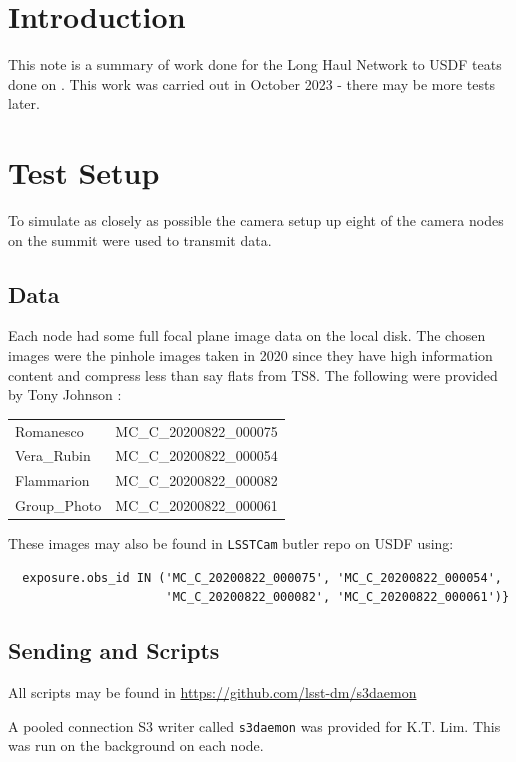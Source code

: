 
\section{Introduction}

This note is a summary of work done for the Long Haul Network to USDF teats done on .
This work was carried out in October 2023 - there may be more tests later.

\section {Test Setup}

To simulate as closely as possible the camera setup up eight of the camera nodes on the summit
were used to transmit data.

\subsection{Data}
Each node had some full focal plane image data on the local disk.
The chosen images were the pinhole images taken in 2020 since they have high information content and compress less than say flats from TS8.
The following  were provided by Tony Johnson :\\
\begin{tabular}{l l}
Romanesco  & MC\_C\_20200822\_000075\\
Vera\_Rubin & MC\_C\_20200822\_000054\\
Flammarion & MC\_C\_20200822\_000082\\
Group\_Photo & MC\_C\_20200822\_000061\\
\end{tabular}

These images may also be found in {\tt LSSTCam}  butler repo on USDF  using:
\begin{verbatim}
  exposure.obs_id IN ('MC_C_20200822_000075', 'MC_C_20200822_000054',
                      'MC_C_20200822_000082', 'MC_C_20200822_000061')}
\end{verbatim}

\subsection{Sending  and Scripts} \label{sec:setup}

All scripts may be found in \url{https://github.com/lsst-dm/s3daemon}

A pooled connection S3 writer called {\tt s3daemon} was provided for K.T. Lim.
This was run on the background on each node.

